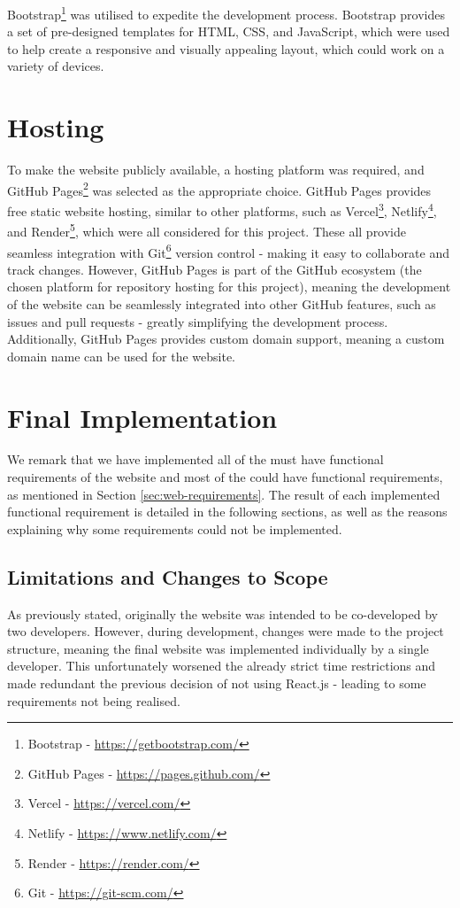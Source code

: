 \documentclass{l4proj}
\begin{document}
Bootstrap\footnote{Bootstrap - \url{https://getbootstrap.com/}} was utilised to expedite the development process. Bootstrap provides a set of pre-designed templates for HTML, CSS, and JavaScript, which were used to help create a responsive and visually appealing layout, which could work on a variety of devices.


\section{Hosting}\label{sec:competition-hosting}
To make the website publicly available, a hosting platform was required, and GitHub Pages\footnote{GitHub Pages - \url{https://pages.github.com/}} was selected as the appropriate choice. GitHub Pages provides free static website hosting, similar to other platforms, such as Vercel\footnote{Vercel - \url{https://vercel.com/}}, Netlify\footnote{Netlify - \url{https://www.netlify.com/}}, and Render\footnote{Render - \url{https://render.com/}}, which were all considered for this project. These all provide seamless integration with Git\footnote{Git - \url{https://git-scm.com/}} version control - making it easy to collaborate and track changes. However, GitHub Pages is part of the GitHub ecosystem (the chosen platform for repository hosting for this project), meaning the development of the website can be seamlessly integrated into other GitHub features, such as issues and pull requests - greatly simplifying the development process. Additionally, GitHub Pages provides custom domain support, meaning a custom domain name can be used for the website.


\section{Final Implementation}
We remark that we have implemented all of the must have functional requirements of the website and most of the could have functional requirements, as mentioned in Section \ref{sec:web-requirements}. The result of each implemented functional requirement is detailed in the following sections, as well as the reasons explaining why some requirements could not be implemented.

\subsection{Limitations and Changes to Scope}
As previously stated, originally the website was intended to be co-developed by two developers. However, during development, changes were made to the project structure, meaning the final website was implemented individually by a single developer. This unfortunately worsened the already strict time restrictions and made redundant the previous decision of not using React.js - leading to some requirements not being realised.
\end{document}

